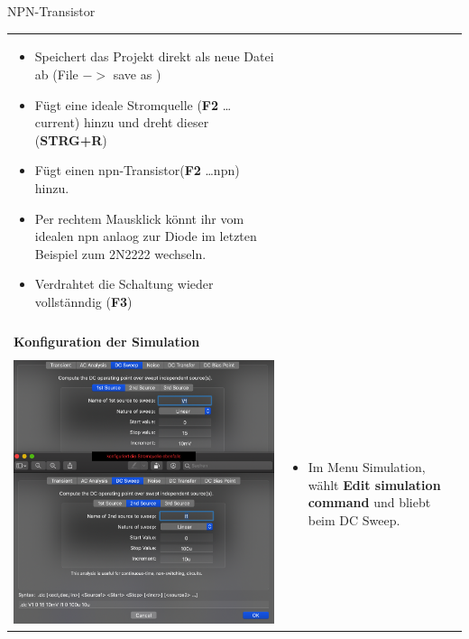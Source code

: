 \begin{frame}[t]{NPN-Transistor}
\begin{spacing}{0.9}
\begin{tiny}
\begin{table}[h!]
\begin{tabular}{p{3cm} p{7cm}}
\begin{minipage}{.7\textwidth}
\begin{itemize}
              \item Speichert das Projekt direkt als neue Datei ab (File $->$ save as )
              \item Fügt eine ideale Stromquelle (\textbf{F2} \dots current) hinzu und dreht dieser (\textbf{STRG+R})
              \item Fügt einen npn-Transistor(\textbf{F2} \dots npn) hinzu.
              \item Per rechtem Mausklick könnt ihr vom idealen npn anlaog zur Diode im letzten Beispiel zum 2N2222 wechseln.
              \item Verdrahtet die Schaltung wieder vollstänndig (\textbf{F3})
            \end{itemize}
          \end{minipage}
          \\
                                                & \\
          \hline
          \textbf{Konfiguration der Simulation} & \\
          \hline                                  \\
          \begin{minipage}{.3\textwidth}
            \includegraphics[width=0.8\linewidth]{pictures/simulationcmd_3.png}
          \end{minipage}
                                                &
          \begin{minipage}{.7\textwidth}
            \begin{itemize}
              \item Im Menu Simulation, wählt \textbf{Edit simulation command} und bliebt beim DC Sweep.

\end{itemize}
\end{minipage}
\end{tabular}
\end{table}
\end{tiny}
\end{spacing}
\end{frame}
